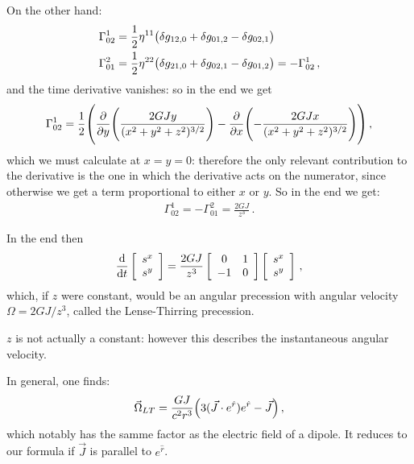 \documentclass[main.tex]{subfiles}
\begin{document}
On the other hand: 
%
\begin{align}
  \Gamma^{1}_{02} &= \frac{1}{2} \eta^{11} \qty(
      \delta g_{12, 0} + \delta g_{01, 2} 
      - \delta g_{02, 1}
  ) \\
  \Gamma^{2}_{01} &= \frac{1}{2} \eta^{22} \qty(
    \delta g_{21, 0} + \delta g_{02, 1} 
    - \delta g_{01, 2}
) = - \Gamma^{1}_{02}
\,,
\end{align}
%
and the time derivative vanishes: so in the end we get 
%
\begin{align}
  \Gamma^{1}_{02} = \frac{1}{2} \qty(\pdv{}{y} \qty(\frac{2GJy}{(x^2+y^2+z^2)^{3/2}}) - \pdv{}{x} \qty(- \frac{2GJx}{(x^2+y^2+z^2)^{3/2}}))
\,,
\end{align}
%
which we must calculate at \(x=y=0\): therefore the only relevant contribution to the derivative is the one in which the derivative acts on the numerator, since otherwise we get a term proportional to either \(x\) or \(y\). So in the end we get: 
%
\begin{align}
  \Gamma^{1}_{02} = - \Gamma^{2}_{01} = \frac{2GJ}{z^3}
\,.
\end{align}

In the end then 
%
\begin{align}
  \dv{}{t} \left[\begin{array}{c}
  s^{x} \\ 
  s^{y}
  \end{array}\right] =
  \frac{2GJ}{z^3}
  \left[\begin{array}{cc}
  0 & 1 \\ 
  -1 & 0
  \end{array}\right]
  \left[\begin{array}{c}
    s^{x} \\ 
    s^{y}
\end{array}\right]
\,,
\end{align}
%
which, if \(z\) were constant, would be an angular precession with angular velocity \(\Omega = 2GJ/z^3\), called the Lense-Thirring precession. 

\(z\) is not actually a constant: however this describes the instantaneous angular velocity. 

In general, one finds: 
%
\begin{align}
  \vec{\Omega}_{LT} = \frac{GJ}{c^2r^3} \qty(3 (\vec{J} \cdot e^{\hat{r}}) e^{\hat{r}} - \vec{J})
\,,
\end{align}
%
which notably has the samme factor as the electric field of a dipole. It reduces to our formula if \(\vec{J}\) is parallel to \(e^{\hat{r}}\). 
\end{document}
